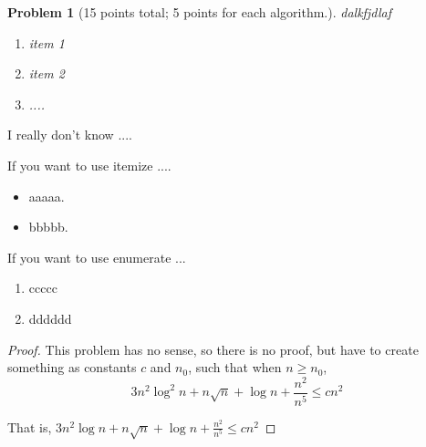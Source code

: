\documentclass[11pt]{article}
\newtheorem{problem}{Problem}
\begin{document}


\begin{problem}[15 points total; 5 points for each algorithm.]
\label{prob:7}
dalkfjdlaf

\begin{enumerate}
\item  item 1

\item  item 2

\item ....
\end{enumerate}
\end{problem}




\newpage


\bigskip
{}
I really don't know ....

If you want to use itemize ....
\begin{itemize}
\item aaaaa. 
\item bbbbb.
\end{itemize}


If you want to use enumerate ...

\begin{enumerate}
\item ccccc
\item dddddd
\end{enumerate}

\bigskip



\begin{proof}
This problem has no sense, so there is no proof, but have to create
something
as constants $c$ and $n_0$,
  such that when $n\geq n_0$,
$$
3n^2\log^2 n+n\sqrt{n}+\log n + \frac{n^2}{n^5}\leq c n^2
$$

That is, 
$
3n^2\log n+n\sqrt{n}+\log n + \frac{n^2}{n^5}\leq c n^2
$
\end{proof}

\bigskip

\end{document}
